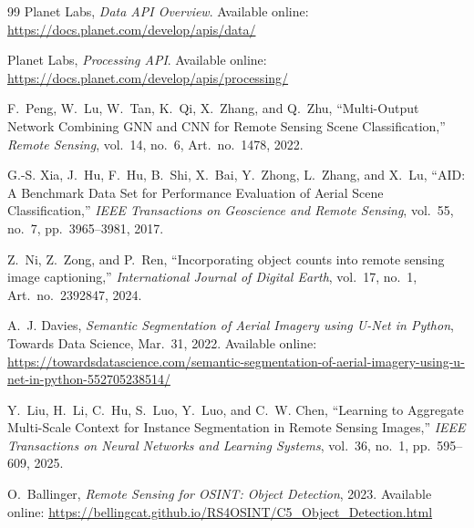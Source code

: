 \documentclass[11pt,a4paper]{article}
\begin{document}
\begin{thebibliography}{99}
Planet Labs,
\textit{Data API Overview}.
Available online:
\url{https://docs.planet.com/develop/apis/data/}

Planet Labs,
\textit{Processing API}.
Available online:
\url{https://docs.planet.com/develop/apis/processing/}

F.~Peng, W.~Lu, W.~Tan, K.~Qi, X.~Zhang, and Q.~Zhu,
``Multi-Output Network Combining GNN and CNN for Remote Sensing Scene Classification,''
\textit{Remote Sensing},
vol.~14, no.~6, Art.~no.~1478, 2022.

G.-S. Xia, J.~Hu, F.~Hu, B.~Shi, X.~Bai, Y.~Zhong, L.~Zhang,
and X.~Lu,
``AID: A Benchmark Data Set for Performance Evaluation of Aerial
Scene Classification,''
\textit{IEEE Transactions on Geoscience and Remote Sensing},
vol.~55, no.~7, pp.~3965--3981, 2017.

Z.~Ni, Z.~Zong, and P.~Ren,
``Incorporating object counts into remote sensing image captioning,''
\textit{International Journal of Digital Earth},
vol.~17, no.~1, Art.~no.~2392847, 2024.

A.~J. Davies,
\textit{Semantic Segmentation of Aerial Imagery using U-Net in Python},
Towards Data Science, Mar.~31, 2022.
Available online:
\url{https://towardsdatascience.com/semantic-segmentation-of-aerial-imagery-using-u-net-in-python-552705238514/}

Y.~Liu, H.~Li, C.~Hu, S.~Luo, Y.~Luo, and C.~W. Chen,
``Learning to Aggregate Multi-Scale Context for Instance Segmentation
in Remote Sensing Images,''
\textit{IEEE Transactions on Neural Networks and Learning Systems},
vol.~36, no.~1, pp.~595--609, 2025.

O.~Ballinger,
\textit{Remote Sensing for OSINT: Object Detection},
2023.
Available online:
\url{https://bellingcat.github.io/RS4OSINT/C5_Object_Detection.html}

\end{thebibliography}
\end{document}
